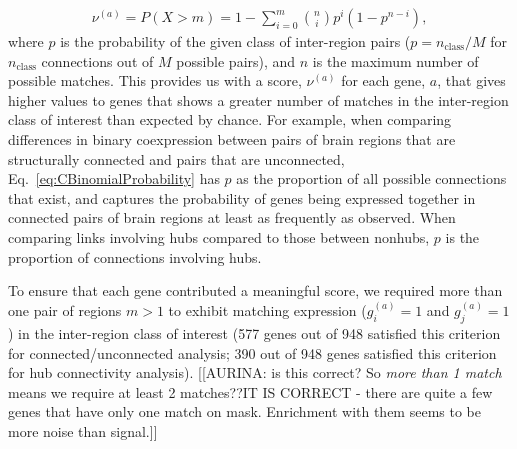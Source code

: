 \documentclass[10pt,letterpaper]{article}
\begin{document}
\begin{eqnarray}
	\label{eq:CBinomialProbability}
     \nu^{(a)} = P(X > m) = 1 - \sum_{i=0}^{m}\binom{n}{i} p^{i}(1-p^{n-i}),
\end{eqnarray}
where $p$ is the probability of the given class of inter-region pairs ($p = n_\mathrm{class}/M$ for $n_\mathrm{class}$ connections out of $M$ possible pairs), and $n$ is the maximum number of possible matches.
This provides us with a score, $\nu^{(a)}$ for each gene, $a$, that gives higher values to genes that shows a greater number of matches in the inter-region class of interest than expected by chance.
For example, when comparing differences in binary coexpression between pairs of brain regions that are structurally connected and pairs that are unconnected, Eq.~\eqref{eq:CBinomialProbability} has $p$ as the proportion of all possible connections that exist, and captures the probability of genes being expressed together in connected pairs of brain regions at least as frequently as observed.
When comparing links involving hubs compared to those between nonhubs, $p$ is the proportion of connections involving hubs.


To ensure that each gene contributed a meaningful score, we required more than one pair of regions $m > 1$ to exhibit matching expression ($g^{(a)}_i = 1$ and $g^{(a)}_j = 1$) in the inter-region class of interest (577 genes out of 948 satisfied this criterion for connected/unconnected analysis; 390 out of 948 genes satisfied this criterion for hub connectivity analysis).
[[AURINA: is this correct? So \emph{more than 1 match} means we require at least 2 matches??IT IS CORRECT - there are quite a few genes that have only one match on mask. Enrichment with them seems to be more noise than signal.]]
\end{document}
